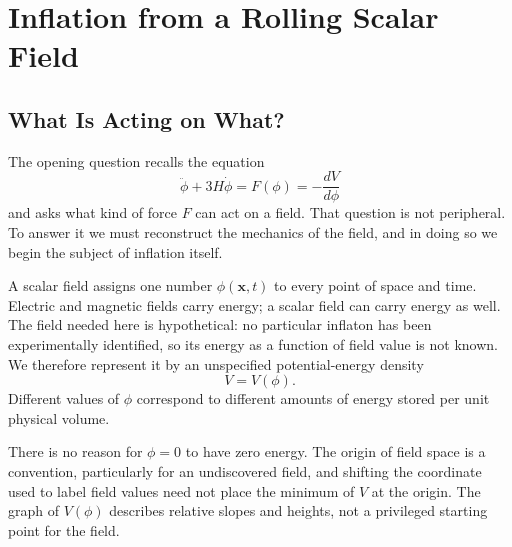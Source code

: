 \chapter{Inflation from a Rolling Scalar Field}


\section{What Is Acting on What?}

The opening question recalls the equation
\begin{equation}
\ddot\phi+3H\dot\phi
=F(\phi)
=-\frac{dV}{d\phi}
\label{eq:c09-opening}
\end{equation}
and asks what kind of force \(F\) can act on a field. That question is not peripheral. To answer it we must reconstruct the mechanics of the field, and in doing so we begin the subject of inflation itself.

A scalar field assigns one number \(\phi(\mathbf x,t)\) to every point of space and time. Electric and magnetic fields carry energy; a scalar field can carry energy as well. The field needed here is hypothetical: no particular inflaton has been experimentally identified, so its energy as a function of field value is not known. We therefore represent it by an unspecified potential-energy density
\begin{equation}
V=V(\phi).
\label{eq:c09-potential}
\end{equation}
Different values of \(\phi\) correspond to different amounts of energy stored per unit physical volume.

There is no reason for \(\phi=0\) to have zero energy. The origin of field space is a convention, particularly for an undiscovered field, and shifting the coordinate used to label field values need not place the minimum of \(V\) at the origin. The graph of \(V(\phi)\) describes relative slopes and heights, not a privileged starting point for the field.

